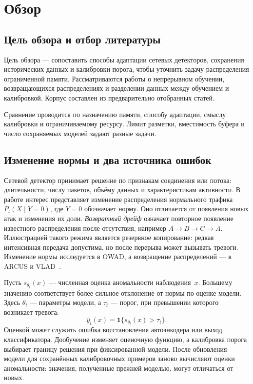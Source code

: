 
\section{Обзор}
\label{sec:relatedworks}

\subsection{Цель обзора и отбор литературы}
\label{subsec:related_scope}

Цель обзора --- сопоставить способы адаптации сетевых детекторов,
сохранения исторических данных и калибровки порога, чтобы уточнить
задачу распределения ограниченной памяти. Рассматриваются работы
о непрерывном обучении, возвращающихся распределениях и разделении
данных между обучением и калибровкой. Корпус составлен из предварительно
отобранных статей.

Сравнение проводится по назначению памяти, способу адаптации,
смыслу калибровки и ограничиваемому ресурсу. Лимит разметки,
вместимость буфера и число сохраняемых моделей задают разные задачи.

\subsection{Изменение нормы и два источника ошибок}
\label{subsec:related_concepts}

Сетевой детектор принимает решение по признакам соединения или
потока: длительности, числу пакетов, объёму данных и характеристикам
активности. В работе интерес представляет изменение распределения
нормального трафика $P_t(X\mid Y=0)$, где $Y=0$ обозначает норму.
Оно отличается от появления новых атак и изменения их доли.
\emph{Возвратный дрейф} означает повторное появление известного
распределения после отсутствия, например $A\to B\to C\to A$.
Иллюстрацией такого режима является резервное копирование: редкая интенсивная
передача допустима, но после перерыва может вызывать тревоги.
Изменение нормы исследуется в OWAD, а возвращение распределений
--- в ARCUS и VLAD~\cite{OWAD2023,ARCUS2022,VLAD2023}.

Пусть $s_{\theta_t}(x)$ --- численная оценка аномальности наблюдения~$x$.
Большему значению соответствует более сильное отклонение от нормы
по оценке модели. Здесь $\theta_t$ --- параметры модели,
а $\tau_t$ --- порог, при превышении которого возникает тревога:
\begin{equation}
    \widehat y_t(x)=\mathbf{1}\{s_{\theta_t}(x)>\tau_t\}.
    \label{eq:related_decision}
\end{equation}
Оценкой может служить ошибка восстановления автоэнкодера или выход
классификатора. Дообучение изменяет оценочную функцию, а калибровка
порога выбирает границу решения при фиксированной модели.
После обновления модели для сохранённых калибровочных примеров
заново вычисляют оценки аномальности: значения, полученные
прежней моделью, могут отличаться от новых.


